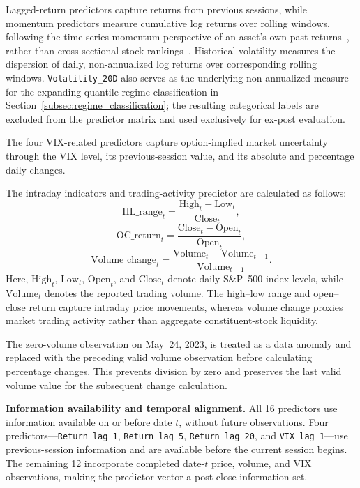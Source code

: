\documentclass[runningheads,orivec]{llncs}
\begin{document}
Lagged-return predictors capture returns from previous sessions, while momentum predictors measure cumulative log returns over rolling windows, following the time-series momentum perspective of an asset's own past returns~\cite{moskowitz2012}, rather than cross-sectional stock rankings~\cite{jegadeesh1993}. Historical volatility measures the dispersion of daily, non-annualized log returns over corresponding rolling windows. \texttt{Volatility\_20D} also serves as the underlying non-annualized measure for the expanding-quantile regime classification in Section~\ref{subsec:regime_classification}; the resulting categorical labels are excluded from the predictor matrix and used exclusively for ex-post evaluation.

The four VIX-related predictors capture option-implied market uncertainty through the VIX level, its previous-session value, and its absolute and percentage daily changes.

The intraday indicators and trading-activity predictor are calculated as follows:
\begin{equation}\label{eq:hl_range}
\text{HL\_range}_t = \frac{\text{High}_t - \text{Low}_t}{\text{Close}_t},
\end{equation}
\begin{equation}\label{eq:oc_return}
\text{OC\_return}_t = \frac{\text{Close}_t - \text{Open}_t}{\text{Open}_t},
\end{equation}
\begin{equation}\label{eq:volume_change}
\text{Volume\_change}_t = \frac{\text{Volume}_t - \text{Volume}_{t-1}}{\text{Volume}_{t-1}}.
\end{equation}
Here, $\text{High}_t$, $\text{Low}_t$, $\text{Open}_t$, and $\text{Close}_t$ denote daily S\&P~500 index levels, while $\text{Volume}_t$ denotes the reported trading volume. The high--low range and open--close return capture intraday price movements, whereas volume change proxies market trading activity rather than aggregate constituent-stock liquidity.

The zero-volume observation on May~24, 2023, is treated as a data anomaly and replaced with the preceding valid volume observation before calculating percentage changes. This prevents division by zero and preserves the last valid volume value for the subsequent change calculation.

\noindent\textbf{Information availability and temporal alignment.} All 16 predictors use information available on or before date $t$, without future observations. Four predictors---\texttt{Return\_lag\_1}, \texttt{Return\_lag\_5}, \texttt{Return\_lag\_20}, and \texttt{VIX\_lag\_1}---use previous-session information and are available before the current session begins. The remaining 12 incorporate completed date-$t$ price, volume, and VIX observations, making the predictor vector a post-close information set.
\end{document}
